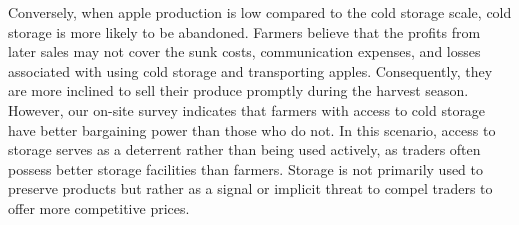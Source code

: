 Conversely, when apple production is low compared to the cold storage scale, cold storage is more likely to be abandoned. Farmers believe that the profits from later sales may not cover the sunk costs, communication expenses, and losses associated with using cold storage and transporting apples. Consequently, they are more inclined to sell their produce promptly during the harvest season. However, our on-site survey indicates that farmers with access to cold storage have better bargaining power than those who do not. In this scenario, access to storage serves as a deterrent rather than being used actively, as traders often possess better storage facilities than farmers. Storage is not primarily used to preserve products but rather as a signal or implicit threat to compel traders to offer more competitive prices.